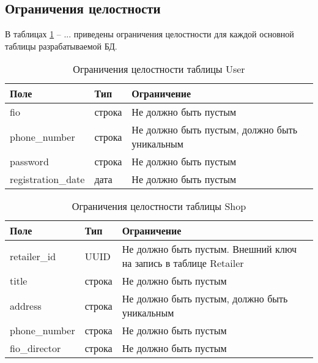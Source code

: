 \subsection{Ограничения целостности}

В таблицах \ref{tbl:entity_user} -- ... приведены ограничения целостности для каждой основной таблицы разрабатываемой БД.
 
\begin{table}[ht]
	\begin{center}
		\begin{threeparttable}
			\caption{Ограничения целостности таблицы User}
			\label{tbl:entity_user}
			\begin{tabular}{|p{4.5cm}|p{2.5cm}|p{8.5cm}|}
				\hline 
				\textbf{Поле} & \textbf{Тип} & \textbf{Ограничение}  \\
				\hline
				fio & строка & Не должно быть пустым  \\
				\hline
				phone\_number & строка & Не должно быть пустым, должно быть уникальным  \\
				\hline
				password & строка & Не должно быть пустым  \\
				\hline
				registration\_date & дата & Не должно быть пустым  \\
				\hline
			\end{tabular}
		\end{threeparttable}			
	\end{center}
\end{table}

\begin{table}[ht]
	\begin{center}
		\begin{threeparttable}
			\caption{Ограничения целостности таблицы Shop}
			\label{tbl:entity_shop}
			\begin{tabular}{|p{4.5cm}|p{2.5cm}|p{8.5cm}|}
				\hline 
				\textbf{Поле} & \textbf{Тип} & \textbf{Ограничение}  \\
				\hline
				retailer\_id & UUID & Не должно быть пустым. Внешний ключ на запись в таблице Retailer   \\
				\hline
				title & строка & Не должно быть пустым \\
				\hline
				address & строка & Не должно быть пустым, должно быть уникальным  \\
				\hline
				phone\_number & строка & Не должно быть пустым  \\
				\hline
				fio\_director & строка & Не должно быть пустым  \\
				\hline
			\end{tabular}
		\end{threeparttable}			
	\end{center}
\end{table}

